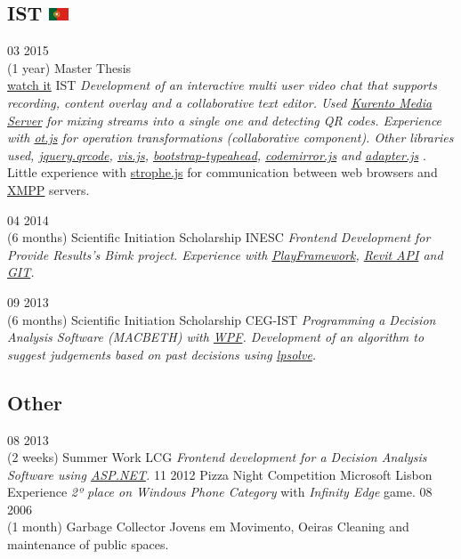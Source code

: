 \documentclass[]{friggeri-cv}
\begin{document}
	\subsection{IST \includegraphics[width=16pt]{pt}}  
		\begin{entrylist}

			\entry
			{03 2015\\(1 year)}
			{Master Thesis \\\href{https://www.youtube.com/watch?v=TWfbcBKbseA}{watch it}}
			{IST}
			{\emph{Development of an interactive multi user video chat that supports recording, content overlay and a collaborative text editor. Used \underline{Kurento Media Server} for mixing streams into a single one and detecting QR codes. Experience with \underline{ot.js} for operation transformations (collaborative component). Other libraries used, \underline{jquery.qrcode}, \underline{vis.js}, \underline{bootstrap-typeahead}, \underline{codemirror.js} and \underline{adapter.js} }. Little experience with \underline{strophe.js} for communication between web browsers and \underline{XMPP} servers. }
			
			\entry
			{04 2014\\(6 months)}
			{Scientific Initiation Scholarship}
			{INESC}
			{\emph{Frontend Development for Provide Results's Bimk project. Experience with \underline{PlayFramework}, \underline{Revit API} and \underline{GIT}.}}
			
			\entry
			{09 2013\\(6 months)}
			{Scientific Initiation Scholarship}
			{CEG-IST}
			{\emph{Programming a Decision Analysis Software (MACBETH) with \underline{WPF}. Development of an algorithm to suggest judgements based on past decisions using \underline{lpsolve}.}}

		\end{entrylist}

\subsection{Other}  
	\begin{entrylist}

		\entry
		{08 2013\\(2 weeks)}
		{Summer Work}
		{LCG}
		{\emph{Frontend development for a Decision Analysis Software using \underline{ASP.NET}. }}
		\entry
		{11 2012}
		{Pizza Night Competition}
		{Microsoft Lisbon Experience}
		{\emph{2º place on Windows Phone Category} with \emph{Infinity Edge} game.}
		\entry
		{08 2006\\(1 month)}
		{Garbage Collector}
		{Jovens em Movimento, Oeiras}
		{Cleaning and maintenance of public spaces.}


		\end{entrylist}
\end{document}
